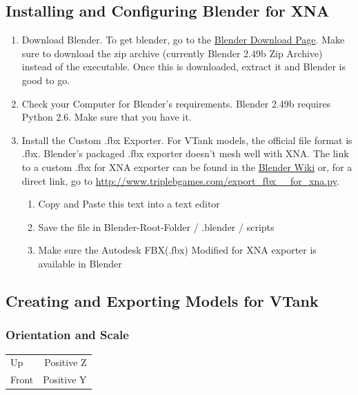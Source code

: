 \subsection{Installing and Configuring Blender for XNA}
\begin {enumerate}
\item {Download Blender.}
To get blender, go to the  \href{http://www.blender.org/download/get-blender}{Blender Download Page}. Make sure to download the zip archive (currently Blender 2.49b Zip Archive) instead of the executable. Once this is downloaded, extract it and Blender is good to go.
 
\item {Check your Computer for Blender's requirements.}
Blender 2.49b requires Python 2.6. Make sure that you have it.

\item {Install the Custom .fbx Exporter.}
For VTank models, the official file format is .fbx. Blender's packaged .fbx exporter doesn't mesh well with XNA. The link to a custom .fbx for XNA exporter can be found in the \href{http://wiki.blender.org/index.php/Extensions:2.4/Py/Scripts/Export/FBX-xna}
{Blender Wiki}
or, for a direct link, go to
\url{http://www.triplebgames.com/export_fbx__for_xna.py}.

\begin{enumerate}
	\item Copy and Paste this text into a text editor
	\item Save the file in Blender-Root-Folder / .blender / scripts
	\item Make sure the Autodesk FBX(.fbx) Modified for XNA exporter is available in Blender
\end{enumerate}

\end {enumerate}
\subsection {Creating and Exporting Models for VTank}
\subsubsection {Orientation and Scale}

\begin{table}[h]
	\centering
		\begin{tabular} {l | r}
		 Up & Positive Z \\
		 Front & Positive Y\\
			
		\end{tabular}
\end{table}

